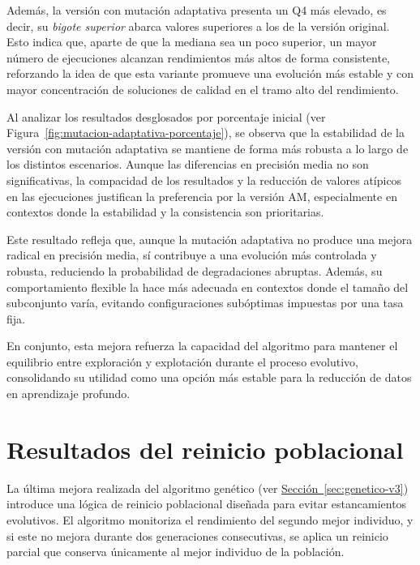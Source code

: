 Además, la versión con mutación adaptativa presenta un Q4 más elevado, es decir, su \textit{bigote superior} abarca valores superiores a los de la versión original.
Esto indica que, aparte de que la mediana sea un poco superior, un mayor número de ejecuciones alcanzan rendimientos más altos de forma consistente,
reforzando la idea de que esta variante promueve una evolución más estable y con mayor concentración de soluciones de calidad en el tramo alto del rendimiento.

Al analizar los resultados desglosados por porcentaje inicial (ver Figura~\ref{fig:mutacion-adaptativa-porcentaje}),
se observa que la estabilidad de la versión con mutación adaptativa se mantiene de forma más robusta a lo largo de los distintos escenarios.
Aunque las diferencias en precisión media no son significativas,
la compacidad de los resultados y la reducción de valores atípicos en las ejecuciones justifican la preferencia por la versión AM,
especialmente en contextos donde la estabilidad y la consistencia son prioritarias.

Este resultado refleja que, aunque la mutación adaptativa no produce una mejora radical en precisión media,
sí contribuye a una evolución más controlada y robusta, reduciendo la probabilidad de degradaciones abruptas.
Además, su comportamiento flexible la hace más adecuada en contextos donde el tamaño del subconjunto varía,
evitando configuraciones subóptimas impuestas por una tasa fija.

En conjunto, esta mejora refuerza la capacidad del algoritmo para mantener el equilibrio entre exploración y explotación durante el proceso evolutivo,
consolidando su utilidad como una opción más estable para la reducción de datos en aprendizaje profundo.


\section{Resultados del reinicio poblacional}\label{sec:resultados-reinicio-poblacional}
La última mejora realizada del algoritmo genético (ver \hyperref[sec:genetico-v3]{Sección~\ref*{sec:genetico-v3}})
introduce una lógica de reinicio poblacional diseñada para evitar estancamientos evolutivos.
El algoritmo monitoriza el rendimiento del segundo mejor individuo, y si este no mejora durante dos generaciones consecutivas,
se aplica un reinicio parcial que conserva únicamente al mejor individuo de la población.

